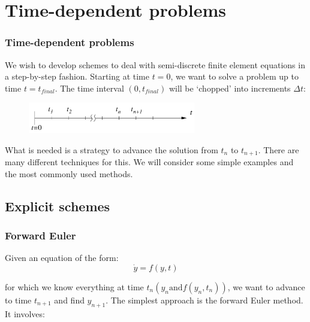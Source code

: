 \documentclass[notes]{beamer}
\begin{document}
\section{Time-dependent problems}
\begin{frame}
\frametitle{Time-dependent problems}

We wish to develop schemes to deal with semi-discrete finite element equations in a
step-by-step fashion. Starting at time $t = 0$, we want to solve a problem up to time
$t = t_{final}$. The time interval $(0, t_{final})$ will be `chopped' into increments $\Delta t$:
\begin{figure}[ht]
	\centering
	\includegraphics[width=0.65\textwidth]{figs/time-steps.png}
\end{figure}

What is needed is a strategy to advance the solution from $t_n$ to $t_{n+1}$. There are many
different techniques for this. We will consider some simple examples and the most commonly used methods.

\end{frame}

\subsection{Explicit schemes}
\begin{frame}
\frametitle{Forward Euler}
Given an equation of the form:
\begin{equation*}
	\dot{y}  = f(y, t)
\end{equation*}

for which we know everything at time $t_n(y_n\mathrm{ and } f(y_n, t_n))$,
we want to advance to time $t_{n+1}$ and find $y_{n+1}$. The simplest
approach is the forward Euler method. It involves:
\end{frame}
\end{document}

